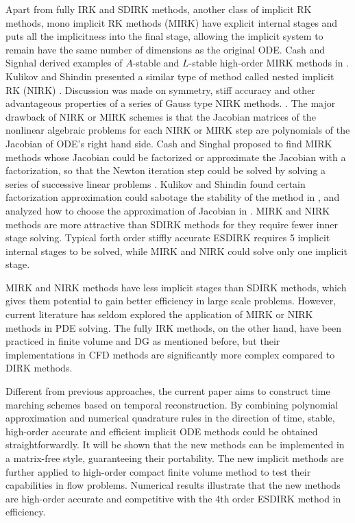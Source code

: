 \documentclass[preprint,12pt]{elsarticle}
\begin{document}
Apart from fully IRK and SDIRK methods,
another class of implicit RK methods,
mono implicit RK methods (MIRK)
\cite{cash1975classMIRKOrig}
have explicit internal stages and
puts all the implicitness into the final
stage, allowing the implicit system to
remain have the same number of dimensions
as the original ODE.
Cash and Signhal derived examples of
$A$-stable and $L$-stable high-order
MIRK methods in
\cite{cash1977clasMIRK1,cash1982monoMIRK2}.
Kulikov and Shindin presented a similar type
of method called nested implicit RK (NIRK)
\cite{kulikov2006familyNIRKOrig}.
Discussion was made on symmetry, stiff accuracy and
other advantageous properties of a series of Gauss type
NIRK methods.
\cite{kulikov2009adaptive}.
The major drawback of NIRK or MIRK schemes is that
the Jacobian matrices of the nonlinear algebraic problems
for each NIRK or MIRK step are
polynomials of the Jacobian of ODE's right hand side.
Cash and Singhal proposed to find MIRK methods whose
Jacobian could be factorized or approximate the Jacobian
with a factorization,
so that the Newton iteration
step could be solved by solving a series of successive linear
problems \cite{cash1982monoMIRK2}.
Kulikov and Shindin found certain factorization
approximation could sabotage the stability of
the method in
\cite{kulikov2009adaptive},
and analyzed how to choose the approximation of
Jacobian in
\cite{kulikov2007asymptotic}.
MIRK and NIRK methods are more attractive than SDIRK methods
for they require fewer inner stage solving.
Typical forth order
stiffly accurate ESDIRK requires 5 implicit internal stages to be
solved,
while MIRK and NIRK could
solve only one implicit stage.


MIRK and NIRK methods have less
implicit stages than SDIRK methods,
which gives them potential to gain better efficiency in
large scale problems.
However, current literature has seldom explored
the application of MIRK or NIRK methods in
PDE solving.
The fully IRK methods, on the other hand,
have been practiced in
finite volume \cite{jameson2017evaluation} and
DG \cite{pazner2017stage}
as mentioned before,
but their implementations
in CFD methods are significantly more
complex compared to DIRK methods.

Different from previous approaches,
the current paper aims to construct
time marching schemes based on temporal
reconstruction.
By combining polynomial approximation and
numerical quadrature rules in the direction of time,
stable, high-order accurate and efficient implicit ODE methods could be
obtained straightforwardly.
It will be shown that the new methods can be implemented
in a matrix-free style, guaranteeing their portability.
The new implicit methods are further applied to
high-order compact finite volume method to
test their capabilities in flow problems. Numerical results
illustrate that the new methods are high-order accurate
and competitive with the 4th order ESDIRK method in efficiency.
\end{document}
